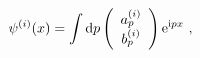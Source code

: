 \begin{equation}
\psi^{(i)}(x) = \int {\rm d}p \left( \begin{array}{c} a^{(i)}_p \\ b^{(i)}_p \end{array} \right) {\rm e}^{{\rm i}px}\ , 
\label{eq9p}
\end{equation}

